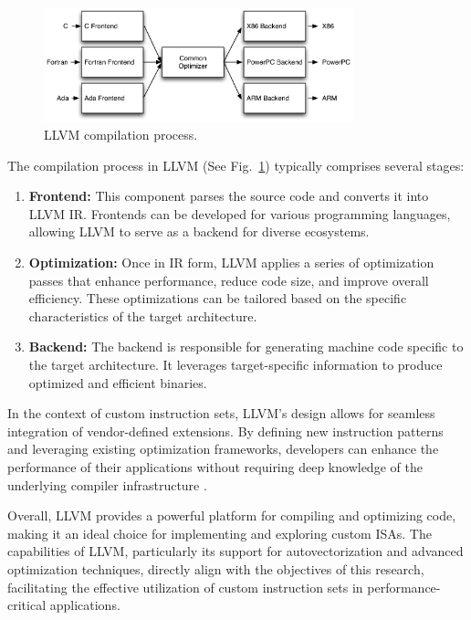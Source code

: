 \begin{figure}
    \centering
    \includegraphics[width=0.8\textwidth]{figures/llvm.png}
    \caption{LLVM compilation process. \cite{llvmfigure}}
    \label{fig:llvm}
\end{figure}

The compilation process in LLVM (See Fig.~\ref{fig:llvm}) typically comprises several stages:

\begin{enumerate}
    \item \textbf{Frontend:} This component parses the source code and converts it into LLVM IR. Frontends can be developed for various programming languages, allowing LLVM to serve as a backend for diverse ecosystems.

    \item \textbf{Optimization:} Once in IR form, LLVM applies a series of optimization passes that enhance performance, reduce code size, and improve overall efficiency. These optimizations can be tailored based on the specific characteristics of the target architecture.

    \item \textbf{Backend:} The backend is responsible for generating machine code specific to the target architecture. It leverages target-specific information to produce optimized and efficient binaries.
\end{enumerate}

In the context of custom instruction sets, LLVM's design allows for seamless integration of vendor-defined extensions. By defining new instruction patterns and leveraging existing optimization frameworks, developers can enhance the performance of their applications without requiring deep knowledge of the underlying compiler infrastructure \cite{llvm}.

Overall, LLVM provides a powerful platform for compiling and optimizing code, making it an ideal choice for implementing and exploring custom ISAs. The capabilities of LLVM, particularly its support for autovectorization and advanced optimization techniques, directly align with the objectives of this research, facilitating the effective utilization of custom instruction sets in performance-critical applications.


